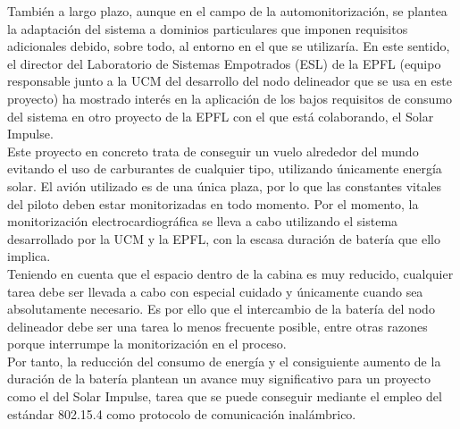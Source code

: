 	También a largo plazo, aunque en el campo de la automonitorización, se plantea la adaptación del
	sistema a dominios particulares que imponen requisitos adicionales debido, sobre todo, al entorno
	en el que se utilizaría. En este sentido, el director del Laboratorio de Sistemas Empotrados (ESL)
	de la EPFL (equipo responsable junto a la UCM del desarrollo del nodo delineador que se usa en
	este proyecto) ha mostrado interés en la aplicación de los bajos requisitos de consumo del sistema
	en otro proyecto de la EPFL con el que está colaborando, el Solar Impulse.\\

	Este proyecto en concreto trata de conseguir un vuelo alrededor del mundo evitando el uso de
	carburantes de cualquier tipo, utilizando únicamente energía solar. El avión utilizado es de una
	única plaza, por lo que las constantes vitales del piloto deben estar monitorizadas en todo
	momento. Por el momento, la monitorización electrocardiográfica se lleva a cabo utilizando el
	sistema desarrollado por la UCM y la EPFL, con la escasa duración de batería que ello implica.\\

	Teniendo en cuenta que el espacio dentro de la cabina es muy reducido, cualquier tarea debe ser
	llevada a cabo con especial cuidado y únicamente cuando sea absolutamente necesario. Es por ello
	que el intercambio de la batería del nodo delineador debe ser una tarea lo menos frecuente posible,
	entre otras razones porque interrumpe la monitorización en el proceso.\\

	Por tanto, la reducción del consumo de energía y el consiguiente aumento de la duración de la
	batería plantean un avance muy significativo para un proyecto como el del Solar Impulse, tarea
	que se puede conseguir mediante el empleo del estándar 802.15.4 como protocolo de comunicación
	inalámbrico.\\


